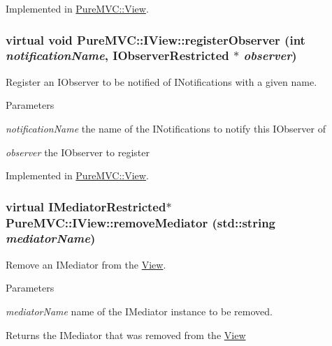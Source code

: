 Implemented in \hyperlink{class_pure_m_v_c_1_1_view_a6980c6deed6fff89a94c8cb09df7a644}{PureMVC::View}.\hypertarget{class_pure_m_v_c_1_1_i_view_a20f6f6e91366a0efc193a70944249830}{
\subsubsection[{registerObserver}]{\setlength{\rightskip}{0pt plus 5cm}virtual void PureMVC::IView::registerObserver (int {\em notificationName}, \/  {\bf IObserverRestricted} $\ast$ {\em observer})}}
\label{class_pure_m_v_c_1_1_i_view_a20f6f6e91366a0efc193a70944249830}


Register an {\ttfamily IObserver} to be notified of {\ttfamily INotifications} with a given name. 
\begin{DoxyParams}{Parameters}
\item[{\em notificationName}]the name of the {\ttfamily INotifications} to notify this {\ttfamily IObserver} of \item[{\em observer}]the {\ttfamily IObserver} to register \end{DoxyParams}


Implemented in \hyperlink{class_pure_m_v_c_1_1_view_a42ebef42cf8d7dc72d05e4c11e75cd66}{PureMVC::View}.\hypertarget{class_pure_m_v_c_1_1_i_view_a569728502b696d2e195b80ebfd8b85eb}{
\subsubsection[{removeMediator}]{\setlength{\rightskip}{0pt plus 5cm}virtual {\bf IMediatorRestricted}$\ast$ PureMVC::IView::removeMediator (std::string {\em mediatorName})}}
\label{class_pure_m_v_c_1_1_i_view_a569728502b696d2e195b80ebfd8b85eb}


Remove an {\ttfamily IMediator} from the {\ttfamily \hyperlink{class_pure_m_v_c_1_1_view}{View}}. 
\begin{DoxyParams}{Parameters}
\item[{\em mediatorName}]name of the {\ttfamily IMediator} instance to be removed. \end{DoxyParams}
\begin{DoxyReturn}{Returns}
the {\ttfamily IMediator} that was removed from the {\ttfamily \hyperlink{class_pure_m_v_c_1_1_view}{View}} 
\end{DoxyReturn}


